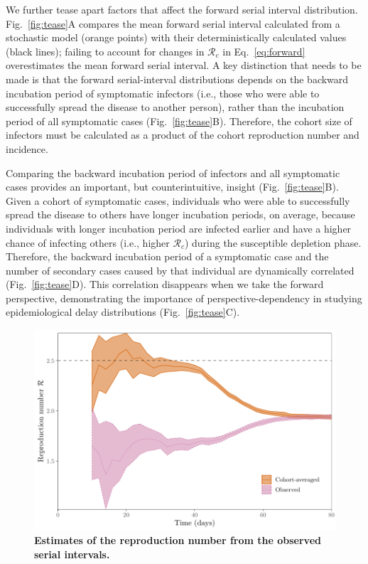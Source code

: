 \documentclass[12pt]{article}
\newcommand{\eref}[1]{Eq.~\ref{eq:#1}}
\newcommand{\fref}[1]{Fig.~\ref{fig:#1}}
\begin{document}
We further tease apart factors that affect the forward serial interval distribution.
\fref{tease}A compares the mean forward serial interval calculated from a stochastic model (orange points) with their deterministically calculated values (black lines);
failing to account for changes in $\mathcal R_c$ in \eref{forward} overestimates the mean forward serial interval.
A key distinction that needs to be made is that the forward serial-interval distributions depends on the backward incubation period of symptomatic infectors (i.e., those who were able to successfully spread the disease to another person), rather than the incubation period of all symptomatic cases (\fref{tease}B).
Therefore, the cohort size of infectors must be calculated as a product of the cohort reproduction number and incidence.

Comparing the backward incubation period of infectors and all symptomatic cases provides an important, but counterintuitive, insight (\fref{tease}B).
Given a cohort of symptomatic cases, individuals who were able to successfully spread the disease to others have longer incubation periods, on average,
because individuals with longer incubation period are infected earlier and have a higher chance of infecting others (i.e., higher $\mathcal R_c$) during the susceptible depletion phase.
Therefore, the backward incubation period of a symptomatic case and the number of secondary cases caused by that individual are dynamically correlated (\fref{tease}D).
This correlation disappears when we take the forward perspective, demonstrating the importance of perspective-dependency in studying epidemiological delay distributions (\fref{tease}C).

\begin{figure}[!th]
\includegraphics[width=\textwidth]{observedrR.pdf}
\caption{
\textbf{Estimates of the reproduction number from the observed serial intervals.}
}
\label{fig:obsrR}
\end{figure}
\end{document}
